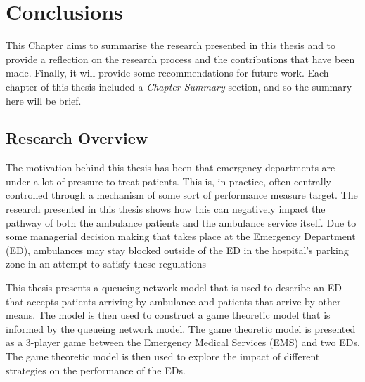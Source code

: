 \chapter{Conclusions}\label{sec:conclusion}

This Chapter aims to summarise the research presented in this thesis and to
provide a reflection on the research process and the
contributions that have been made.
Finally, it will provide some recommendations for future work.
Each chapter of this thesis included a \textit{Chapter Summary} section, and
so the summary here will be brief.


\section{Research Overview}

The motivation behind this thesis has been that emergency departments
are under a lot of pressure to treat patients.
This is, in practice, often centrally controlled through a mechanism of some
sort of performance measure target.
The research presented in this thesis shows how this can negatively impact the
pathway of both the ambulance patients and the ambulance service itself.
Due to some managerial decision making that takes place at the Emergency
Department (ED), ambulances may
stay blocked outside of the ED in the hospital's parking zone in an attempt to
satisfy these regulations

This thesis presents a queueing network model that is used to describe an
ED that accepts patients arriving by ambulance and
patients that arrive by other means.
The model is then used to construct a game theoretic model that is informed
by the queueing network model.
The game theoretic model is presented as a 3-player game between the
Emergency Medical Services (EMS) and two EDs.
The game theoretic model is then used to explore the impact of different
strategies on the performance of the EDs.

